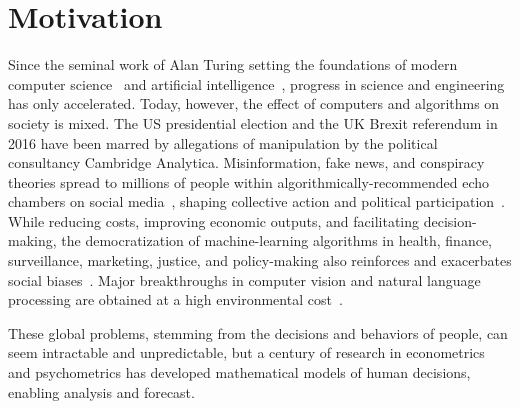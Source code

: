 \section{Motivation}
\label{in:sec:motivation}

Since the seminal work of Alan Turing setting the foundations of modern computer science~\citep{turing1937computable} and artificial intelligence~\citep{turing2009computing}, progress in science and engineering has only accelerated.
Today, however, the effect of computers and algorithms on society is mixed.
The US presidential election and the UK Brexit referendum in 2016 have been marred by allegations of manipulation by the political consultancy Cambridge Analytica.
Misinformation, fake news, and conspiracy theories spread to millions of people within algorithmically-recommended echo chambers on social media~\citep{kumar2016disinformation,garimella2018political,brugnoli2019recursive,ribeiro2020auditing,cinelli2021echo}, shaping collective action and political participation~\citep{margetts2015political}.
While reducing costs, improving economic outputs, and facilitating decision-making, the democratization of machine-learning algorithms in health, finance, surveillance, marketing, justice, and policy-making also reinforces and exacerbates social biases~\citep{baeza2016data,hajian2016algorithmic,stoica2018algorithmic,rodolfa2020case}.
Major breakthroughs in computer vision and natural language processing are obtained at a high environmental cost~\citep{strubell2019energy}.

These global problems, stemming from the decisions and behaviors of people, can seem intractable and unpredictable, but a century of research in econometrics and psychometrics has developed mathematical models of human decisions, enabling analysis and forecast.

